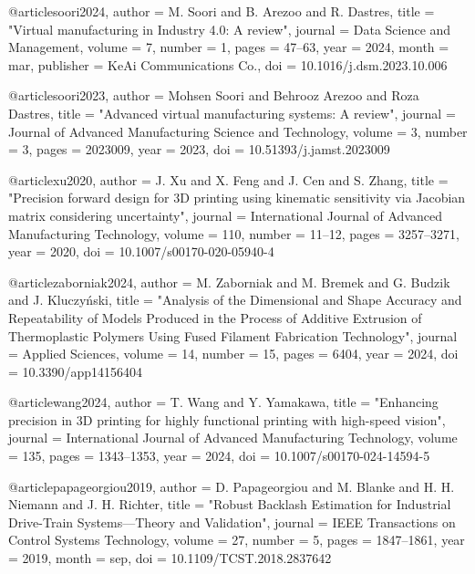@article{soori2024,
	author    = {M. Soori and B. Arezoo and R. Dastres},
	title     = "{Virtual manufacturing in Industry 4.0: A review}",
	journal   = {Data Science and Management},
	volume    = {7},
	number    = {1},
	pages     = {47--63},
	year      = {2024},
	month     = mar,
	publisher = {KeAi Communications Co.},
	doi       = {10.1016/j.dsm.2023.10.006}
}

@article{soori2023,
	author    = {Mohsen Soori and Behrooz Arezoo and Roza Dastres},
	title     = "{Advanced virtual manufacturing systems: A review}",
	journal   = {Journal of Advanced Manufacturing Science and Technology},
	volume    = {3},
	number    = {3},
	pages     = {2023009},
	year      = {2023},
	doi       = {10.51393/j.jamst.2023009}
}

@article{xu2020,
	author    = {J. Xu and X. Feng and J. Cen and S. Zhang},
	title     = "{Precision forward design for 3D printing using kinematic sensitivity via Jacobian matrix considering uncertainty}",
	journal   = {International Journal of Advanced Manufacturing Technology},
	volume    = {110},
	number    = {11--12},
	pages     = {3257--3271},
	year      = {2020},
	doi       = {10.1007/s00170-020-05940-4}
}

@article{zaborniak2024,
	author    = {M. Zaborniak and M. Bremek and G. Budzik and J. Kluczyński},
	title     = "{Analysis of the Dimensional and Shape Accuracy and Repeatability of Models Produced in the Process of Additive Extrusion of Thermoplastic Polymers Using Fused Filament Fabrication Technology}",
	journal   = {Applied Sciences},
	volume    = {14},
	number    = {15},
	pages     = {6404},
	year      = {2024},
	doi       = {10.3390/app14156404}
}

@article{wang2024,
	author    = {T. Wang and Y. Yamakawa},
	title     = "{Enhancing precision in 3D printing for highly functional printing with high-speed vision}",
	journal   = {International Journal of Advanced Manufacturing Technology},
	volume    = {135},
	pages     = {1343--1353},
	year      = {2024},
	doi       = {10.1007/s00170-024-14594-5}
}

@article{papageorgiou2019,
	author    = {D. Papageorgiou and M. Blanke and H. H. Niemann and J. H. Richter},
	title     = "{Robust Backlash Estimation for Industrial Drive-Train Systems—Theory and Validation}",
	journal   = {IEEE Transactions on Control Systems Technology},
	volume    = {27},
	number    = {5},
	pages     = {1847--1861},
	year      = {2019},
	month     = sep,
	doi       = {10.1109/TCST.2018.2837642}
}

